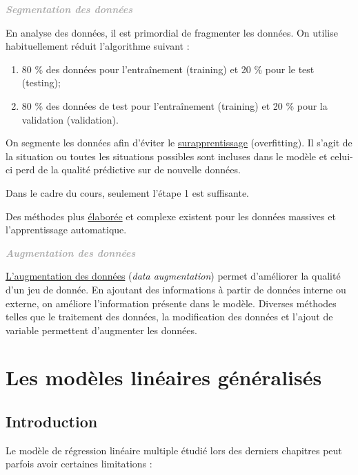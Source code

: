 \documentclass[11pt,french]{report}
\newenvironment{moreInfo}[1]
	{\begin{mdframed}
	\textcolor{darkgray}{\huge \raisebox{-3.5pt}{\faInfo} 
	\hspace{0.5cm} \large\bfseries #1}\\[5pt]
	\normalsize
	\makebox[0.1\textwidth][l]{}	
	\begin{minipage}{10cm}}
	{	\end{minipage}
	\end{mdframed}}
\begin{document}
\begin{moreInfo}{\color{Gray}\emph{Segmentation des données}
     \color{black}}
      En analyse des données, il est primordial de fragmenter les données. On utilise habituellement réduit l'algorithme suivant :
      \begin{enumerate}
      \item 80 \% des données pour l'entraînement (training) et 20 \% pour le test (testing);
      \item 80 \% des données de test pour l'entraînement  (training) et 20 \% pour la validation (validation). 
      \end{enumerate}
      On segmente les données afin d'éviter le \href{https://fr.wikipedia.org/wiki/Surapprentissage}{surapprentissage} (overfitting). Il s'agit de la situation ou toutes les situations possibles sont incluses dans le modèle et celui-ci perd de la qualité prédictive sur de nouvelle données. \newline
      
      Dans le cadre du cours, seulement l'étape 1 est suffisante. \newline
      
      Des méthodes plus \href{https://fr.wikipedia.org/wiki/Validation_croisée}{élaborée} et complexe existent pour les données massives et l'apprentissage automatique.
\end{moreInfo}

\begin{moreInfo}{\color{Gray}\emph{Augmentation des données}
     \color{black}}
     \href{https://www.quora.com/What-does-the-term-data-Augmentation-mean-in-the-context-of-Machine-Learning}{L'augmentation des données} (\emph{data augmentation}) permet d'améliorer la qualité d'un jeu de donnée. En ajoutant des informations à partir de données interne ou externe, on améliore l'information présente dans le modèle. Diverses méthodes telles que le traitement des données, la modification des données et l'ajout de variable permettent d'augmenter les données.
\end{moreInfo}

\chapter{Les modèles linéaires généralisés}
\section{Introduction}
Le modèle de régression linéaire multiple étudié lors des derniers chapitres peut parfois avoir certaines limitations : 
\end{document}

